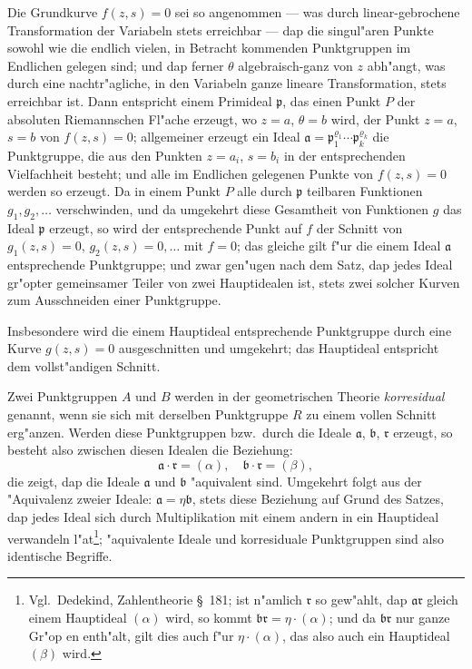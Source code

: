 \documentclass[12pt,a4paper]{article}
\begin{document}
Die Grundkurve $f(z,s)=0$ sei so angenommen --- was durch linear-gebrochene Transformation der Variabeln stets erreichbar --- dap die singul"aren Punkte sowohl wie die endlich vielen, in Betracht kommenden Punktgruppen im Endlichen gelegen sind; und dap ferner $\theta$ algebraisch-ganz von $z$ abh"angt, was durch eine nachtr"agliche, in den Variabeln ganze lineare Transformation, stets erreichbar ist. Dann entspricht einem Primideal $\mathfrak{p}$, das einen Punkt $P$ der absoluten Riemannschen Fl"ache erzeugt, wo $z=a$, $\theta=b$ wird, der Punkt $z=a$, $s=b$ von $f(z,s)=0$; allgemeiner erzeugt ein Ideal $\mathfrak{a} = \mathfrak{p}_1^{\varrho_1} \cdots \mathfrak{p}_k^{\varrho_k}$ die Punktgruppe, die aus den Punkten $z=a_i$, $s=b_i$ in der entsprechenden Vielfachheit besteht; und alle im Endlichen gelegenen Punkte von $f(z,s)=0$ werden so erzeugt. Da in einem Punkt $P$ alle durch $\mathfrak{p}$ teilbaren Funktionen $g_1, g_2, \ldots$ verschwinden, und da umgekehrt diese Gesamtheit von Funktionen $g$ das Ideal $\mathfrak{p}$ erzeugt, so wird der entsprechende Punkt auf $f$ der Schnitt von $g_1(z,s)=0$, $g_2(z,s)=0,\ldots$ mit $f=0$; das gleiche gilt f"ur die einem Ideal $\mathfrak{a}$ entsprechende Punktgruppe; und zwar gen"ugen nach dem Satz, dap jedes Ideal gr"opter gemeinsamer Teiler von zwei Hauptidealen ist, stets zwei solcher Kurven zum Ausschneiden einer Punktgruppe.

Insbesondere wird die einem Hauptideal entsprechende Punktgruppe durch eine Kurve $g(z,s)=0$ ausgeschnitten und umgekehrt; das Hauptideal entspricht dem vollst"andigen Schnitt.

Zwei Punktgruppen $A$ und $B$ werden in der geometrischen Theorie \emph{korresidual} genannt, wenn sie sich mit derselben Punktgruppe $R$ zu einem vollen Schnitt erg"anzen. Werden diese Punktgruppen bzw.\ durch die Ideale $\mathfrak{a}$, $\mathfrak{b}$, $\mathfrak{r}$ erzeugt, so besteht also zwischen diesen Idealen die Beziehung:
\[
\mathfrak{a} \cdot \mathfrak{r} = (\alpha), \quad \mathfrak{b} \cdot \mathfrak{r} = (\beta),
\]
die zeigt, dap die Ideale $\mathfrak{a}$ und $\mathfrak{b}$ "aquivalent sind. Umgekehrt folgt aus der "Aquivalenz zweier Ideale: $\mathfrak{a} = \eta\mathfrak{b}$, stets diese Beziehung auf Grund des Satzes, dap jedes Ideal sich durch Multiplikation mit einem andern in ein Hauptideal verwandeln l"at\footnote{Vgl.\ Dedekind, Zahlentheorie \S\ 181; ist n"amlich $\mathfrak{r}$ so gew"ahlt, dap $\mathfrak{a}\mathfrak{r}$ gleich einem Hauptideal $(\alpha)$ wird, so kommt $\mathfrak{b}\mathfrak{r} = \eta \cdot (\alpha)$; und da $\mathfrak{b}\mathfrak{r}$ nur ganze Gr"op en enth"alt, gilt dies auch f"ur $\eta \cdot (\alpha)$, das also auch ein Hauptideal $(\beta)$ wird.}; "aquivalente Ideale und korresiduale Punktgruppen sind also identische Begriffe.
\end{document}
